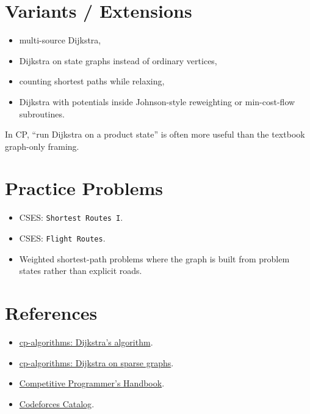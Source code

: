\section*{Variants / Extensions}

\begin{itemize}
  \item multi-source Dijkstra,
  \item Dijkstra on state graphs instead of ordinary vertices,
  \item counting shortest paths while relaxing,
  \item Dijkstra with potentials inside Johnson-style reweighting or min-cost-flow subroutines.
\end{itemize}

In CP, ``run Dijkstra on a product state'' is often more useful than the textbook graph-only framing.

\section*{Practice Problems}

\begin{itemize}
  \item CSES: \texttt{Shortest Routes I}.
  \item CSES: \texttt{Flight Routes}.
  \item Weighted shortest-path problems where the graph is built from problem states rather than explicit roads.
\end{itemize}

\section*{References}

\begin{itemize}
  \item \href{https://cp-algorithms.com/graph/dijkstra.html}{cp-algorithms: Dijkstra's algorithm}.
  \item \href{https://cp-algorithms.com/graph/dijkstra_sparse.html}{cp-algorithms: Dijkstra on sparse graphs}.
  \item \href{https://usaco.guide/CPH.pdf}{Competitive Programmer's Handbook}.
  \item \href{https://codeforces.com/catalog}{Codeforces Catalog}.
\end{itemize}

